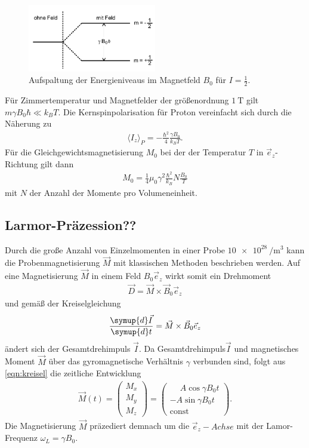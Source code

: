 \begin{figure}
 \centering
 \includegraphics[width=0.5\textwidth]{Zeeman.PNG}
 \caption{Aufspaltung der Energieniveaus im Magnetfeld $B_0$ für $I=\tfrac{1}{2}$.}
 \label{fig:Proton}
\end{figure}
Für Zimmertemperatur und Magnetfelder
der größenordnung $\SI{1}{\tesla}$
gilt $m\gamma B_0 \hbar \ll k_BT$.
Die Kernspinpolarisation für Proton
vereinfacht sich
durch die Näherung zu
\begin{align}
\langle I_z\rangle_P= -\frac{\hbar^2}{4}\frac{\gamma B_0}{k_B T}.
\end{align}
Für die Gleichgewichtsmagnetisierung $M_0$ bei der
der Temperatur $T$ in $\vec{e}_z$-Richtung gilt dann
\begin{align}
M_0=\frac{1}{4}\mu_0 \gamma^2 \frac{\hbar^2}{k_B} N \frac{B_0}{T}
\end{align}
mit $N$ der Anzahl der Momente pro Volumeneinheit.

\subsection{Larmor-Präzession??}
\label{subsec:zielsetzung}
Durch die große Anzahl von Einzelmomenten in einer Probe \approx $\SI{10e28}{\per\cubic\meter}$
kann die Probenmagnetisierung $\vec{M}$ mit klassischen Methoden
beschrieben werden.
Auf eine Magnetisierung $\vec{M}$ in einem Feld $B_0\vec{e}_z$
wirkt somit ein Drehmoment
\begin{align}
\vec{D}=\vec{M} \times \vec{B}_0 \vec{e}_z
\end{align}
und gemäß der Kreiselgleichung
\begin{align}
  \frac{\symup{d}\vec{I}}{\symup{d}t}=\vec{M}\times\vec{B}_0 \vec{e}_z \label{eqn:kreisel}
\end{align}
 ändert sich der Gesamtdrehimpuls $\vec{I}$.
Da Gesamtdrehimpuls$\vec{I}$ und magnetisches Moment $\vec{M}$
über das gyromagnetische Verhältnis $\gamma$
verbunden sind, folgt aus \eqref{eqn:kreisel}
die zeitliche Entwicklung
\begin{align}
  \vec{M}(t)=
  \left( \begin{array}{c} M_x \\ M_y \\ M_z \end{array}\right)
=\left( \begin{array}{c} \phantom{-}A\cos\gamma B_0 t \\ -A\sin\gamma B_0 t \\ \text{const} \end{array}\right).
\end{align}
Die Magnetisierung $\vec{M}$ präzediert demnach um die
$\vec{e}_z-Achse$ mit der Lamor-Frequenz $\omega_L=\gamma B_0$.

